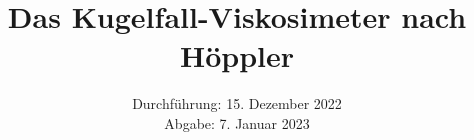

\subject{\texorpdfstring{\vspace{2ex}}{}207\texorpdfstring{\vspace{-2ex}}{}} %
\title{Das Kugelfall\texorpdfstring{\hspace{0.15ex}}{}-\texorpdfstring{\hspace{-0.15ex}}{}Viskosimeter nach Höppler} %
\date{
	Durchführung: 15. Dezember 2022 %
	\\ Abgabe: 7. Januar 2023 %
}

\AtNextBibliography{\scriptsize}



\maketitle
{}

\thispagestyle{empty}
\tableofcontents
\newpage






\printbibliography{}


